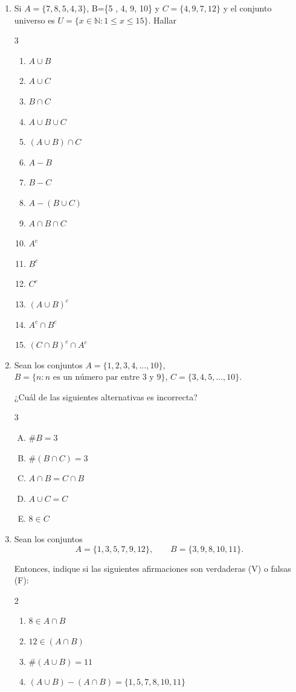 \documentclass[12pt]{article}
\begin{document}
\begin{enumerate}
\item Si $A=\{7, 8, 5 ,4 ,3\}$,  B=\{5 , 4, 9, 10\} y  $C=\{4, 9, 7, 12\}$ y el conjunto universo es $U=\{x\in\mathbb{N}: 1\leq x\leq 15\}.$
Hallar
\begin{multicols}{3}
    \begin{enumerate}
    \item $A\cup B$
    \item $A\cup C$
    \item $B\cap C$
    \item $A\cup B\cup C$
    \item $ (A \cup B)\cap C$
    \item $A-B$
    \item $B-C$
    \item $A-(B\cup C)$
    \item $A\cap B\cap C$
    \item $A^c$
    \item $B^c$
    \item $C^c$
    \item $(A\cup B)^c$
    \item $A^c \cap B^c$
    \item $(C\cap B)^c\cap A^c 
    $
\end{enumerate}
\end{multicols}



\item Sean los conjuntos
$A=\{1,2,3,4,\ldots,10\}$,
$
B=\{n : n \text{ es un número par entre } 3 \text{ y } 9\}
$, $
C=\{3,4,5,\ldots,10\}.
$

¿Cuál de las siguientes alternativas es incorrecta?
\begin{multicols}{3}
\begin{enumerate}[A)]
\item $\# B=3$
\item $\# (B\cap C)=3$
\item $A\cap B=C\cap B$
\item $A\cup C=C$
\item$8\in C$
\end{enumerate}
\end{multicols}



\item Sean los conjuntos
\[
A=\{1,3,5,7,9,12\}, \qquad B=\{3,9,8,10,11\}.
\]

Entonces, indique si las siguientes afirmaciones son verdaderas (V) o falsas (F):
\begin{multicols}{2}
    \begin{enumerate}
\item $8\in A\cap B$
\item $12\in (A\cap B)$
\item $\#(A\cup B)=11$
\item $(A\cup B)-(A\cap B)=\{1,5,7,8,10,11\}$
\end{enumerate}
\end{multicols}



\end{enumerate}
\end{document}
